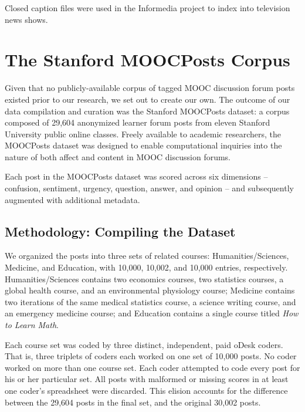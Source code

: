 \documentclass{edm_template}
\begin{document}
Closed caption files were used in the Informedia project
\cite{Wactlar:1996:IAD:619007.620445} to index into television news
shows.


\section{The Stanford MOOCPosts Corpus}
\label{sec:MOOCPosts}

Given that no publicly-available corpus of tagged MOOC discussion forum posts existed prior to our research, we set out to create our own. The outcome of our data compilation and curation was the Stanford MOOCPosts dataset: a corpus composed of 29,604 anonymized learner forum posts from eleven Stanford University public online classes. Freely available to academic researchers, the MOOCPosts dataset was designed to enable computational inquiries into the nature of both affect and content in MOOC discussion forums.

Each post in the MOOCPosts dataset was scored across six dimensions -- confusion, sentiment, urgency, question, answer, and opinion -- and subsequently augmented with additional metadata.


\subsection{Methodology: Compiling the Dataset}
We organized the posts into three sets of related courses: Humanities/Sciences, Medicine, and Education, with 10,000, 10,002, and 10,000 entries, respectively. Humanities/Sciences contains two economics courses, two statistics courses, a global health course, and an environmental physiology course; Medicine contains two iterations of the same medical statistics course, a science writing course, and an emergency medicine course; and Education contains a single course titled \emph{How to Learn Math}. 

Each course set was coded by three distinct, independent, paid oDesk coders. That is, three triplets of coders each worked on one set of 10,000 posts. No coder worked on more than one course set. Each coder attempted to code every post for his or her particular set. All posts with malformed or missing scores in at least one coder's spreadsheet were discarded. This elision accounts for the difference between the 29,604 posts in the final set, and the original 30,002 posts.
\end{document}
